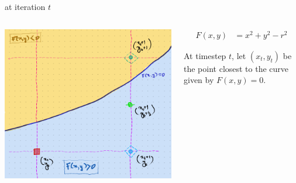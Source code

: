 \documentclass[aspectratio=169,xcolor={dvipsnames,svgnames}]{beamer}
\begin{document}
\begin{frame}[label={sec:org1aff3dd}]{at iteration \(t\)}
\begin{columns}
\begin{column}{.4\columnwidth}
\begin{center}
\includegraphics[width=.9\linewidth]{org-download-images/mid-point_algorithm/2024-09-03_22-08-34_screenshot.png}
\end{center}
\end{column}


\begin{column}{.6\columnwidth}
\begin{align*}
  F(x, y) &= x^2 + y^2 - r^2
\end{align*}

At timestep \(t\), let \((x_{t}, y_{t})\) be the point
closest to the curve given by \(F(x,y)=0\).
\end{column}
\end{columns}
\end{frame}
\end{document}
